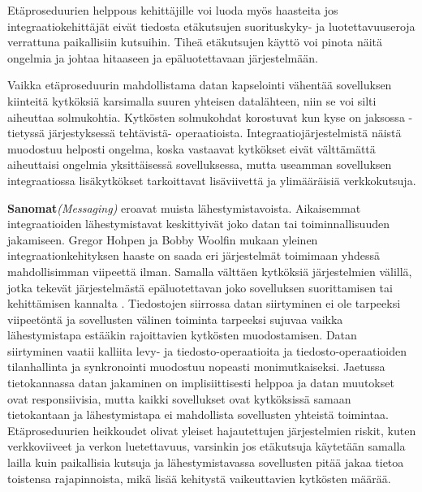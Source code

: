 Etäproseduurien helppous kehittäjille voi luoda myös haasteita jos integraatiokehittäjät eivät tiedosta etäkutsujen suorituskyky- ja luotettavuuseroja verrattuna paikallisiin kutsuihin. Tiheä etäkutsujen käyttö voi pinota näitä ongelmia ja johtaa hitaaseen ja epäluotettavaan järjestelmään.

Vaikka etäproseduurin mahdollistama datan kapselointi vähentää sovelluksen kiinteitä kytköksiä karsimalla suuren yhteisen datalähteen, niin se voi silti aiheuttaa solmukohtia. Kytkösten solmukohdat korostuvat kun kyse on jaksossa - tietyssä järjestyksessä tehtävistä- operaatioista.
Integraatiojärjestelmistä näistä muodostuu helposti ongelma, koska vastaavat kytkökset eivät välttämättä aiheuttaisi ongelmia yksittäisessä sovelluksessa, mutta useamman sovelluksen integraatiossa lisäkytkökset tarkoittavat lisäviivettä ja ylimääräisiä verkkokutsuja.

\textbf{Sanomat}\textit{(Messaging)} eroavat muista lähestymistavoista. Aikaisemmat integraatioiden lähestymistavat keskittyivät joko datan tai toiminnallisuuden jakamiseen. Gregor Hohpen ja Bobby Woolfin mukaan yleinen integraationkehityksen haaste on saada eri järjestelmät toimimaan yhdessä mahdollisimman viipeettä ilman. Samalla välttäen kytköksiä järjestelmien välillä, jotka tekevät järjestelmästä epäluotettavan joko sovelluksen suorittamisen tai kehittämisen kannalta \citep[sivu~72]{Hohpe2004}. Tiedostojen siirrossa datan siirtyminen ei ole tarpeeksi viipeetöntä ja sovellusten välinen toiminta tarpeeksi sujuvaa vaikka lähestymistapa estääkin rajoittavien kytkösten muodostamisen. Datan siirtyminen vaatii kalliita levy- ja tiedosto-operaatioita ja tiedosto-operaatioiden tilanhallinta ja synkronointi muodostuu nopeasti monimutkaiseksi.
Jaetussa tietokannassa datan jakaminen on implisiittisesti helppoa ja datan muutokset ovat responsiivisia, mutta kaikki sovellukset ovat kytköksissä samaan tietokantaan ja lähestymistapa ei mahdollista sovellusten yhteistä toimintaa.
Etäproseduurien heikkoudet olivat yleiset hajautettujen järjestelmien riskit, kuten verkkoviiveet ja verkon luetettavuus, varsinkin jos etäkutsuja käytetään samalla lailla kuin paikallisia kutsuja ja lähestymistavassa sovellusten pitää jakaa tietoa toistensa rajapinnoista, mikä lisää kehitystä vaikeuttavien kytkösten määrää.

